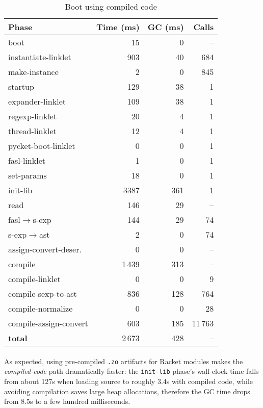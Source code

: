 		\begin{table}[ht]
		\centering
		\begin{tabular}{@{}lrrr@{}}
			\toprule
			Phase & Time (ms) & GC (ms) & Calls \\ \midrule
			boot                           &     15 &    0 & -- \\
			instantiate-linklet            &    903 &   40 & 684 \\
			make-instance                  &      2 &    0 & 845 \\
			startup                        &    129 &   38 & 1 \\
			\quad expander-linklet         &    109 &   38 & 1 \\
			\quad regexp-linklet                 &     20 &    4 & 1 \\
			\quad thread-linklet                 &     12 &    4 & 1 \\
			\quad pycket-boot-linklet            &      0 &    0 & 1 \\
			\quad fasl-linklet             &      1 &    0 & 1 \\
			\quad set-params               &     18 &    0 & 1 \\
			init-lib					   &	3387 &   361 & 1 \\ \midrule
			read                           &    146 &   29 & -- \\
			\quad fasl$\rightarrow$s-exp   &    144 &   29 & 74 \\
			\quad s-exp$\rightarrow$ast    &      2 &    0 & 74 \\
			\quad assign-convert-deser.    &      0 &    0 & -- \\ \midrule
			compile                        &  1\,439 &  313 & -- \\
			\quad compile-linklet          &      0 &    0 & 9 \\
			\quad compile-sexp-to-ast      &    836 &  128 & 764 \\
			\quad compile-normalize        &      0 &    0 & 28 \\
			\quad compile-assign-convert   &    603 &  185 & 11\,763 \\ \midrule
			\textbf{total}                 &  2\,673 &  428 & -- \\
			\bottomrule
		\end{tabular}
		\caption{Boot using compiled code}
		\label{table:boot-compiled}
		\end{table}

		\paragraph{}%
			As expected, using pre-compiled \texttt{.zo} artifacts for Racket modules makes the \emph{compiled-code} path dramatically faster: the \texttt{init-lib} phase's wall-clock time falls from about 127s when loading source to roughly 3.4s with compiled code, while avoiding compilation saves large heap allocations, therefore the GC time drops from 8.5s to a few hundred milliseconds.

